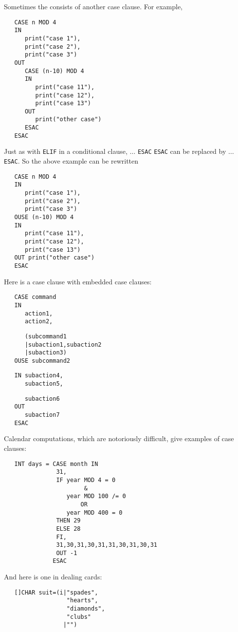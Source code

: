 Sometimes the
consists of another case clause. For example,
\begin{verbatim}
   CASE n MOD 4
   IN
      print("case 1"),
      print("case 2"),
      print("case 3")
   OUT
      CASE (n-10) MOD 4
      IN
         print("case 11"),
         print("case 12"),
         print("case 13")
      OUT
         print("other case")
      ESAC
   ESAC
\end{verbatim}
\noindent
Just as with \verb|ELIF| in a conditional clause, 
$\ldots$ \verb|ESAC| \verb|ESAC| can be replaced by  $\ldots$
\verb|ESAC|. So the above example can be rewritten
\begin{verbatim}
   CASE n MOD 4
   IN
      print("case 1"),
      print("case 2"),
      print("case 3")
   OUSE (n-10) MOD 4
   IN
      print("case 11"),
      print("case 12"),
      print("case 13")
   OUT print("other case")
   ESAC
\end{verbatim}
\noindent
Here is a case clause with embedded case clauses:
\begin{verbatim}
   CASE command
   IN
      action1,
      action2,
\end{verbatim}
\begin{verbatim}
      (subcommand1
      |subaction1,subaction2
      |subaction3)
   OUSE subcommand2
\end{verbatim}
\begin{verbatim}
   IN subaction4,
      subaction5,
\end{verbatim}
\begin{verbatim}
      subaction6
   OUT
      subaction7
   ESAC
\end{verbatim}
\noindent
Calendar computations, which are notoriously difficult, give examples
of case clauses:
\begin{verbatim}
   INT days = CASE month IN
               31,
               IF year MOD 4 = 0
                       &
                  year MOD 100 /= 0
                      OR
                  year MOD 400 = 0
               THEN 29
               ELSE 28
               FI,
               31,30,31,30,31,31,30,31,30,31
               OUT -1
              ESAC
\end{verbatim}
\noindent
And here is one in dealing cards:
\begin{verbatim}
   []CHAR suit=(i|"spades",
                  "hearts",
                  "diamonds",
                  "clubs"
                 |"")
\end{verbatim}

